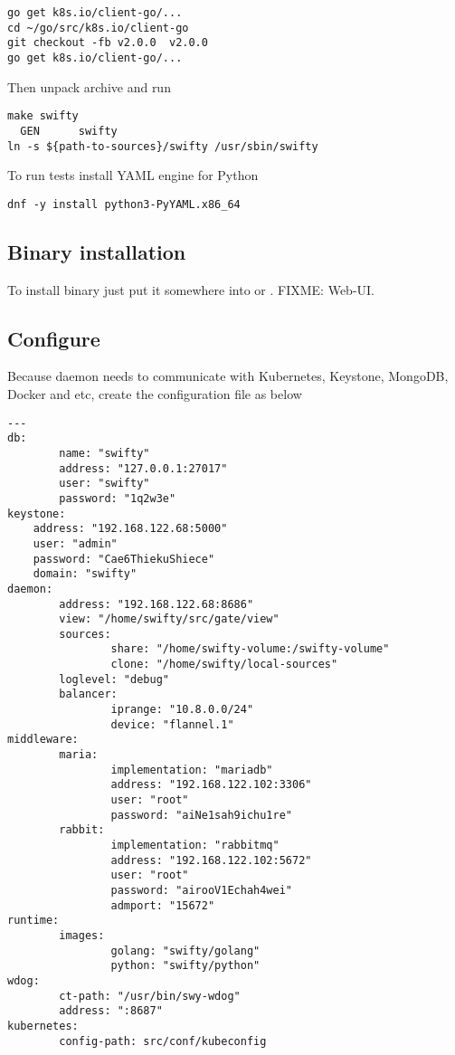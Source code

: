 \begin{lstlisting}
go get k8s.io/client-go/...
cd ~/go/src/k8s.io/client-go
git checkout -fb v2.0.0  v2.0.0
go get k8s.io/client-go/...
\end{lstlisting}

Then unpack  archive and run

\begin{lstlisting}
make swifty
  GEN      swifty
ln -s ${path-to-sources}/swifty /usr/sbin/swifty
\end{lstlisting}

To run tests install YAML engine for Python

\begin{lstlisting}
dnf -y install python3-PyYAML.x86_64
\end{lstlisting}

\subsection{Binary installation}
\label{subsec:setup-swifty-bin}

To install binary just put it somewhere into 
or . FIXME: Web-UI.

\subsection{Configure}
\label{subsec:setup-swifty-conf}

Because  daemon needs to communicate with Kubernetes,
Keystone, MongoDB, Docker and etc, create the 
configuration file as below

\begin{lstlisting}
---
db:
        name: "swifty"
        address: "127.0.0.1:27017"
        user: "swifty"
        password: "1q2w3e"
keystone:
	address: "192.168.122.68:5000"
	user: "admin"
	password: "Cae6ThiekuShiece"
	domain: "swifty"
daemon:
        address: "192.168.122.68:8686"
        view: "/home/swifty/src/gate/view"
        sources:
                share: "/home/swifty-volume:/swifty-volume"
                clone: "/home/swifty/local-sources"
        loglevel: "debug"
        balancer:
                iprange: "10.8.0.0/24"
                device: "flannel.1"
middleware:
        maria:
                implementation: "mariadb"
                address: "192.168.122.102:3306"
                user: "root"
                password: "aiNe1sah9ichu1re"
        rabbit:
                implementation: "rabbitmq"
                address: "192.168.122.102:5672"
                user: "root"
                password: "airooV1Echah4wei"
                admport: "15672"
runtime:
        images:
                golang: "swifty/golang"
                python: "swifty/python"
wdog:
        ct-path: "/usr/bin/swy-wdog"
        address: ":8687"
kubernetes:
        config-path: src/conf/kubeconfig
\end{lstlisting}

